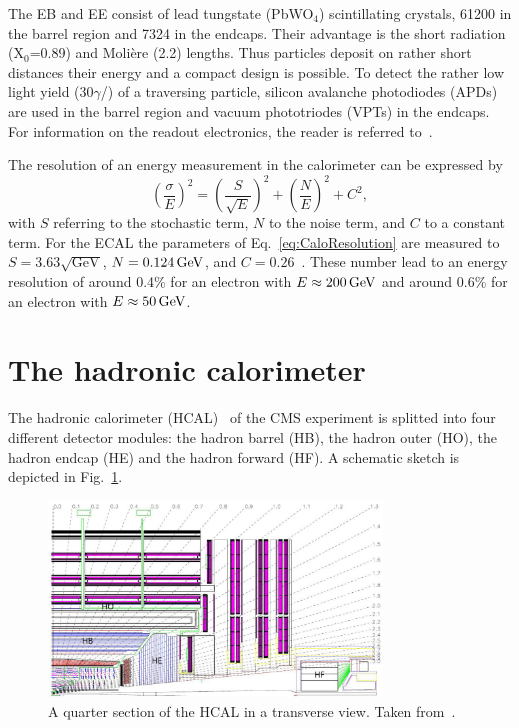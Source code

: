 The EB and EE consist of lead tungstate (PbWO$_4$) scintillating crystals, 61200 in the barrel region and 7324 in the endcaps. 
Their advantage is the short radiation (X$_0$=0.89\cm) and Moli\`ere (2.2\cm) lengths.
Thus particles deposit on rather short distances their energy and a compact design is possible.
To detect the rather low light yield (30$\gamma$/\mev) of a traversing particle, silicon avalanche photodiodes (APDs) are used in the barrel region and vacuum  phototriodes (VPTs) in the endcaps.
For information on the readout electronics, the reader is referred to~\cite{bib:CMS:TDR_2006}.

The resolution of an energy measurement in the calorimeter can be expressed by 
\begin{equation}
\label{eq:CaloResolution}
\left( \frac{\sigma}{E} \right)^2 = \left( \frac{S}{\sqrt{E}} \right)^2 + \left( \frac{N}{E} \right)^2 +C^2,
\end{equation}
with $S$ referring to the stochastic term, $N$ to the noise term, and $C$ to a constant term.
For the ECAL the parameters of Eq.~\eqref{eq:CaloResolution} are measured to $S=3.63\sqrt{\text{GeV}}$, $N=0.124\,\text{Ge}\kern-0.06667em\text{V}$, and $C=0.26$~\cite{bib:CMS:TDR_2006}. These number lead to an energy resolution of around 0.4\% for an electron with $E \approx 200\,\text{Ge}\kern-0.06667em\text{V}$ and around 0.6\% for an electron with $E \approx 50\,\text{Ge}\kern-0.06667em\text{V}$.

\section{The hadronic calorimeter}
The hadronic calorimeter (HCAL)~\cite{bib:CMS:TDR_2006,bib:CMS:TDR_HCAL} of the CMS experiment is splitted into four different detector modules: the hadron barrel (HB), the hadron outer (HO), the hadron endcap (HE) and the hadron forward (HF).
A schematic sketch is depicted in Fig.~\ref{fig:HCAL}.
\begin{figure}[!h]
  \centering
      \includegraphics[width=0.79\textwidth]{figures/experiment/CMS/fig_HCALdiagram.png}
  \caption{A quarter section of the HCAL in a transverse view. Taken from~\cite{bib:CMS:HCAL_Performance_2009}.}  
  \label{fig:HCAL}
\end{figure}

